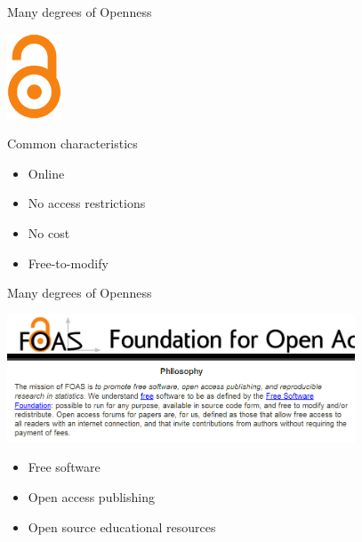\begin{frame}{Many degrees of Openness}

\begin{multicols}{2}
\includegraphics[height = 1in]{OAlogo.png}

\columnbreak

\begin{block}{Common characteristics}
\begin{itemize}
        \item Online
\pause
	\item No access restrictions
\pause
	\item No cost
\pause
	\item Free-to-modify
\end{itemize}
\end{block}
\end{multicols}

\end{frame}


\begin{frame}{Many degrees of Openness}

\includegraphics[height = 1.5in]{FOAS.png}

\begin{itemize}
	\item Free software
\pause
	\item Open access publishing
\pause
	\item Open source educational resources
\end{itemize}

\end{frame}



